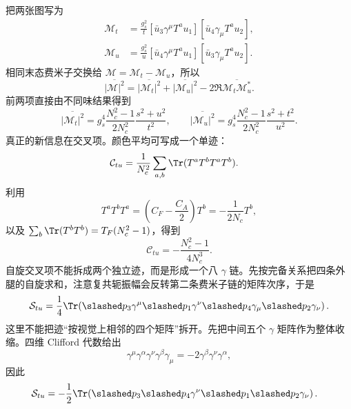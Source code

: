 \begin{derivation}
把两张图写为
\begin{align*}
\mathcal M_t&=\frac{g_s^2}{t}
[\bar u_3\gamma^\mu T^a u_1]
[\bar u_4\gamma_\mu T^a u_2],\\
\mathcal M_u&=\frac{g_s^2}{u}
[\bar u_4\gamma^\mu T^a u_1]
[\bar u_3\gamma_\mu T^a u_2].
\end{align*}
相同末态费米子交换给 $\mathcal M=\mathcal M_t-\mathcal M_u$，所以
\begin{equation*}
\overline{|\mathcal M|^2}
=\overline{|\mathcal M_t|^2}
+\overline{|\mathcal M_u|^2}
-2\Re\overline{\mathcal M_t\mathcal M_u^*}.
\end{equation*}
前两项直接由不同味结果得到
\begin{equation*}
\overline{|\mathcal M_t|^2}
=g_s^4\frac{N_c^2-1}{2N_c^2}\frac{s^2+u^2}{t^2},
\qquad
\overline{|\mathcal M_u|^2}
=g_s^4\frac{N_c^2-1}{2N_c^2}\frac{s^2+t^2}{u^2}.
\end{equation*}
真正的新信息在交叉项。颜色平均可写成一个单迹：
\begin{align*}
\mathcal C_{tu}
&=\frac1{N_c^2}\sum_{a,b}\Tr(T^aT^bT^aT^b).
\end{align*}
利用
\begin{equation*}
T^aT^bT^a=\left(C_F-\frac{C_A}{2}\right)T^b
=-\frac{1}{2N_c}T^b,
\end{equation*}
以及 $\sum_b\Tr(T^bT^b)=T_F(N_c^2-1)$，得到
\begin{equation*}
\mathcal C_{tu}
=-\frac{N_c^2-1}{4N_c^3}.
\end{equation*}
自旋交叉项不能拆成两个独立迹，而是形成一个八 $\gamma$ 链。先按完备关系把四条外腿的自旋求和，注意复共轭振幅会反转第二条费米子链的矩阵次序，于是
\begin{equation*}
\mathcal S_{tu}
=\frac14\Tr\!\left(
\slashed p_3\gamma^\mu\slashed p_1\gamma^\nu
\slashed p_4\gamma_\mu\slashed p_2\gamma_\nu
\right).
\end{equation*}
这里不能把迹“按视觉上相邻的四个矩阵”拆开。先把中间五个 $\gamma$ 矩阵作为整体收缩。四维 Clifford 代数给出
\begin{equation*}
\gamma^\mu\gamma^\alpha\gamma^\nu\gamma^\beta\gamma_\mu
=-2\gamma^\beta\gamma^\nu\gamma^\alpha,
\end{equation*}
因此
\begin{align*}
\mathcal S_{tu}
&=-\frac12\Tr\!\left(
\slashed p_3\slashed p_4\gamma^\nu
\slashed p_1\slashed p_2\gamma_\nu
\right).
\end{align*}

\end{derivation}
